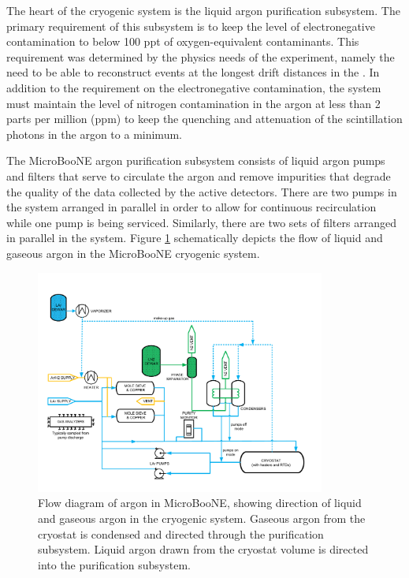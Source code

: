 The heart of the cryogenic system is the liquid argon purification subsystem.  The primary requirement of this subsystem is to keep the level of electronegative contamination to below 100 ppt of oxygen-equivalent contaminants.  This requirement was determined by the physics needs of the experiment, namely the need to be able to reconstruct events at the longest drift distances in the \lartpc.  In addition to the requirement on the electronegative contamination, the system must maintain the level of nitrogen contamination in the argon at less than 2 parts per million (ppm) \cite{Jones:2013bca} to keep the quenching and attenuation of the scintillation photons in the argon to a minimum.  

The MicroBooNE argon purification subsystem consists of liquid argon pumps and filters that serve to circulate the argon and remove impurities that degrade the quality of the data collected by the active detectors.  There are two pumps in the system arranged in parallel in order to allow for continuous recirculation while one pump is being serviced.  Similarly, there are two sets of filters arranged in parallel in the system.  Figure \ref{flowdiagram} schematically depicts the flow of liquid and gaseous argon in the MicroBooNE cryogenic system.

\begin{figure}
\centering 
\includegraphics[width=0.85\textwidth]{figures/cryo_flow.pdf}
\caption{Flow diagram of argon in MicroBooNE, showing direction of liquid and gaseous argon in the cryogenic system.  Gaseous argon from the cryostat is condensed and directed through the purification subsystem. Liquid argon drawn from the cryostat volume is directed into the purification subsystem.}
\label{flowdiagram}
\end{figure}


